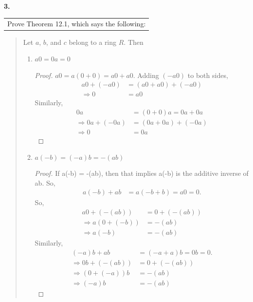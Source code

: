 \documentclass[12pt, letterpaper]{article}
\begin{document}
\bigskip

\textbf{3.} \begin{tabular}[t]{l}
    Prove Theorem 12.1, which says the following:
\end{tabular}

\begin{quote}
    Let $a$, $b$, and $c$ belong to a ring $R$. Then
    \begin{enumerate}
        \item $a0 = 0a = 0$
        \begin{proof}
            $a0 = a(0 + 0) = a0 + a0$. Adding $(-a0)$ to both sides,
            \begin{align*}
                a0 + (-a0) &= (a0 + a0) + (-a0) \\
                \Rightarrow 0 &= a0 
                \end{align*}
            Similarly, 
            \begin{align*}
                0a &= (0 + 0)a = 0a + 0a \\
                \Rightarrow 0a + (-0a) &= (0a + 0a) + (-0a) \\
                \Rightarrow 0 &= 0a 
                \end{align*}
        \end{proof}
        \item $a(-b) = (-a)b = -(ab)$
        \begin{proof}
            If a(-b) = -(ab), then that implies a(-b) is the additive inverse of ab. So,
            \begin{align*}
                a(-b) + ab &= a(-b + b) = a0 = 0.   
                \end{align*}
                So,
                \begin{align*}
                    a0 + (-(ab)) &= 0 + (-(ab)) \\
                    \Rightarrow a(0 + (-b)) &= -(ab) \\
                    \Rightarrow a(-b) &= -(ab)
                    \end{align*}
            Similarly,
            \begin{align*}
                (-a)b + ab &= (-a + a)b = 0b = 0.  \\
                \Rightarrow 0b + (-(ab)) &= 0 + (-(ab)) \\
                \Rightarrow (0 + (-a))b &= -(ab) \\
                \Rightarrow (-a)b &= -(ab)
                \end{align*}

\end{proof}
\end{enumerate}
\end{quote}
\end{document}
